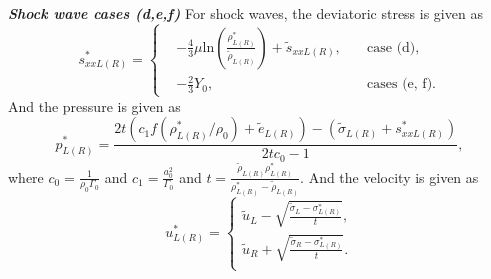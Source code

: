 \documentclass[review]{elsarticle}
\begin{document}
\begin{enumerate}[Step 1]
\emph{\textbf{Shock wave cases (d,e,f)}} 
For shock waves, the  deviatoric stress is given as 
\begin{equation}
  s_{xxL(R)}^* = \left\{\begin{aligned}
	  & -\frac{4}{3}\mu\text{ln}\left(\frac{\rho_{L(R)}^*}{\tilde{\rho}_{L(R)}}\right)+\tilde{s}_{xxL(R)},
	\quad  &\text{case (d)},\\
	& -\frac{2}{3}Y_0,   \quad
	&\text{cases (e, f)}.
  \end{aligned} \right.
  \end{equation}
And the pressure is given as
\begin{equation}
  p^*_{L(R)}= 
  \frac{2t(c_1f(\rho^*_{L(R)}/\rho_0)+\tilde{e}_{L(R)})-(\tilde{\sigma}_{L(R)}+{s}_{xxL(R)}^*)}{2tc_0-1},
\end{equation}
where $c_0 = \frac{1}{\rho_0\Gamma_0}$ and $c_1 = \frac{a_0^2}{\Gamma_0}$ and $ t=\frac{\tilde{\rho}_{L(R)} \rho_{L(R)}^*}{\rho_{L(R)}^*-\tilde{\rho}_{L(R)}}$. 
And the velocity is given as
\begin{equation}
  u_{L(R)}^* = \left\{ \begin{array}{l}
	  \tilde{u}_L -\sqrt{\frac{\tilde{\sigma}_L-\sigma_{L(R)}^*}{t}},\\ 
	  \tilde{u}_R +\sqrt{\frac{\tilde{\sigma}_R-\sigma_{L(R)}^*}{t}}.\\
  \end{array}
\right.
\end{equation}


\end{enumerate}
\end{document}
